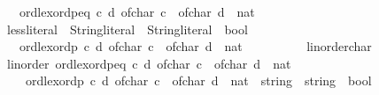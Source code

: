 \begin{isabellebody}
\ \ \ {\isachardoublequoteopen}ord{\isachardot}{\kern0pt}lexordp{\isacharunderscore}{\kern0pt}eq\ {\isacharparenleft}{\kern0pt}{\isasymlambda}c\ d{\isachardot}{\kern0pt}\ of{\isacharunderscore}{\kern0pt}char\ c\ {\isacharless}{\kern0pt}\ {\isacharparenleft}{\kern0pt}of{\isacharunderscore}{\kern0pt}char\ d\ {\isacharcolon}{\kern0pt}{\isacharcolon}{\kern0pt}\ nat{\isacharparenright}{\kern0pt}{\isacharparenright}{\kern0pt}{\isachardoublequoteclose}\isanewline
%
\isadelimproof
\ \ %
\endisadelimproof
%
\isatagproof
\isacommand{{\isachardot}{\kern0pt}}\isamarkupfalse%
\isanewline
\isanewline
{}%
\endisatagproof
{\isafoldproof}%
%
\isadelimproof
%
\endisadelimproof
\ \isamarkupfalse%
\ less{\isacharunderscore}{\kern0pt}literal\ {\isacharcolon}{\kern0pt}{\isacharcolon}{\kern0pt}\ {\isachardoublequoteopen}String{\isachardot}{\kern0pt}literal\ {\isasymRightarrow}\ String{\isachardot}{\kern0pt}literal\ {\isasymRightarrow}\ bool{\isachardoublequoteclose}\isanewline
\ \ \ {\isachardoublequoteopen}ord{\isachardot}{\kern0pt}lexordp\ {\isacharparenleft}{\kern0pt}{\isasymlambda}c\ d{\isachardot}{\kern0pt}\ of{\isacharunderscore}{\kern0pt}char\ c\ {\isacharless}{\kern0pt}\ {\isacharparenleft}{\kern0pt}of{\isacharunderscore}{\kern0pt}char\ d\ {\isacharcolon}{\kern0pt}{\isacharcolon}{\kern0pt}\ nat{\isacharparenright}{\kern0pt}{\isacharparenright}{\kern0pt}{\isachardoublequoteclose}\isanewline
%
\isadelimproof
\ \ %
\endisadelimproof
%
\isatagproof
\isacommand{{\isachardot}{\kern0pt}}\isamarkupfalse%
%
\endisatagproof
{\isafoldproof}%
%
\isadelimproof
\isanewline
%
\endisadelimproof
\isanewline
{}\isamarkupfalse%
%
\isadelimproof
\ %
\endisadelimproof
%
\isatagproof
{}\isamarkupfalse%
\ {\isacharminus}{\kern0pt}\isanewline
\ \ \isamarkupfalse%
\ linorder{\isacharunderscore}{\kern0pt}char\ \isamarkupfalse%
\ linorder\ {\isachardoublequoteopen}ord{\isachardot}{\kern0pt}lexordp{\isacharunderscore}{\kern0pt}eq\ {\isacharparenleft}{\kern0pt}{\isasymlambda}c\ d{\isachardot}{\kern0pt}\ of{\isacharunderscore}{\kern0pt}char\ c\ {\isacharless}{\kern0pt}\ {\isacharparenleft}{\kern0pt}of{\isacharunderscore}{\kern0pt}char\ d\ {\isacharcolon}{\kern0pt}{\isacharcolon}{\kern0pt}\ nat{\isacharparenright}{\kern0pt}{\isacharparenright}{\kern0pt}{\isachardoublequoteclose}\isanewline
\ \ \ \ {\isachardoublequoteopen}ord{\isachardot}{\kern0pt}lexordp\ {\isacharparenleft}{\kern0pt}{\isasymlambda}c\ d{\isachardot}{\kern0pt}\ of{\isacharunderscore}{\kern0pt}char\ c\ {\isacharless}{\kern0pt}\ {\isacharparenleft}{\kern0pt}of{\isacharunderscore}{\kern0pt}char\ d\ {\isacharcolon}{\kern0pt}{\isacharcolon}{\kern0pt}\ nat{\isacharparenright}{\kern0pt}{\isacharparenright}{\kern0pt}\ {\isacharcolon}{\kern0pt}{\isacharcolon}{\kern0pt}\ string\ {\isasymRightarrow}\ string\ {\isasymRightarrow}\ bool{\isachardoublequoteclose}\isanewline

\end{isabellebody}
